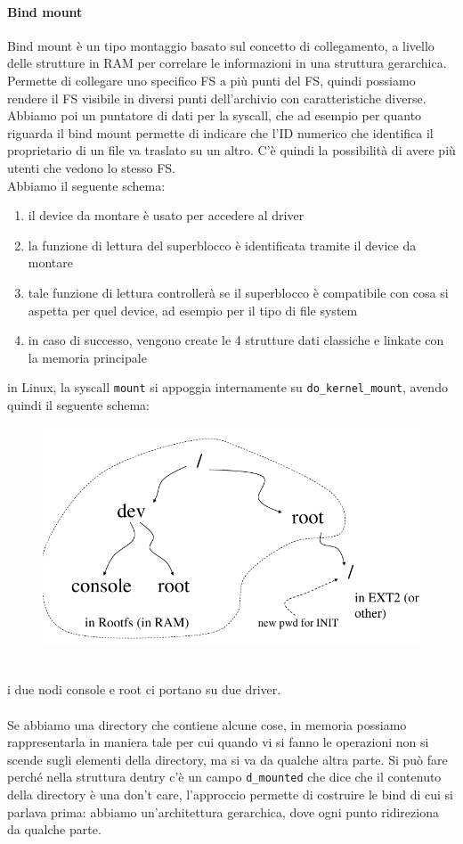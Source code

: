 \documentclass[12pt, oneside]{extbook}
\begin{document}
\paragraph{Bind mount}Bind mount è un tipo montaggio basato sul concetto di collegamento, a livello delle strutture in RAM per correlare le informazioni in una struttura gerarchica. Permette di collegare uno specifico FS a più punti del FS, quindi possiamo rendere il FS visibile in diversi punti dell'archivio con caratteristiche diverse. Abbiamo poi un puntatore di dati per la syscall, che ad esempio per quanto riguarda il bind mount permette di indicare che l'ID numerico che identifica il proprietario di un file va traslato su un altro. C'è quindi la possibilità di avere più utenti che vedono lo stesso FS.\\
Abbiamo il seguente schema:
\begin{enumerate}
	\item il device da montare è usato per accedere al driver
	\item la funzione di lettura del superblocco è identificata tramite il device da montare
	\item tale funzione di lettura controllerà se il superblocco è compatibile con cosa si aspetta per quel device, ad esempio per il tipo di file system
	\item in caso di successo, vengono create le 4 strutture dati classiche e linkate con la memoria principale
\end{enumerate}
in Linux, la syscall \texttt{mount} si appoggia internamente su \texttt{do\_kernel\_mount}, avendo quindi il seguente schema:
\begin{figure}[!h]
	\includegraphics[scale=0.5]{immagini/mount_scheme.png}
\end{figure}
\\i due nodi console e root ci portano su due driver.\\\\Se abbiamo una directory che contiene alcune cose, in memoria possiamo rappresentarla in maniera tale per cui quando vi si fanno le operazioni non si scende sugli elementi della directory, ma si va da qualche altra parte. Si può fare perché nella struttura dentry c'è un campo \texttt{d\_mounted} che dice che il contenuto della directory è una don't care, l'approccio permette di costruire le bind di cui si parlava prima: abbiamo un'architettura gerarchica, dove ogni punto ridireziona da qualche parte.
\end{document}
